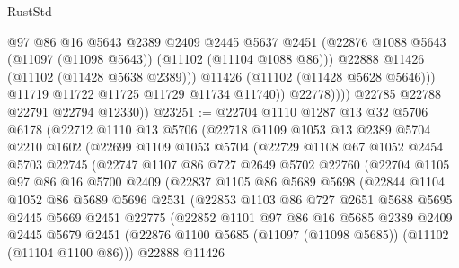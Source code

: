 \begin{lexlean}{RustStd}
\begin{coremodule}
                        @97
                        @86
                        @16
                        @5643
                        @2389
                        @2409
                        @2445
                        @5637
                        @2451
                        (@22876 @1088 @5643 (@11097 (@11098 @5643)) (@11102 (@11104 @1088 @86)))
                        @22888
                        @11426
                        (@11102 (@11428 @5638 @2389)))
                      @11426
                      (@11102 (@11428 @5628 @5646)))
                    @11719
                    @11722
                    @11725
                    @11729
                    @11734
                    @11740))
                @22778))))
        @22785
        @22788
        @22791
        @22794
        @12330))
@23251 := @22704
    @1110
    @1287
    @13
    @32
    @5706
    @6178
    (@22712
      @1110
      @13
      @5706
      (@22718
        @1109
        @1053
        @13
        @2389
        @5704
        @2210
        @1602
        (@22699
          @1109
          @1053
          @5704
          (@22729
            @1108
            @67
            @1052
            @2454
            @5703
            @22745
            (@22747
              @1107
              @86
              @727
              @2649
              @5702
              @22760
              (@22704
                @1105
                @97
                @86
                @16
                @5700
                @2409
                (@22837
                  @1105
                  @86
                  @5689
                  @5698
                  (@22844
                    @1104
                    @1052
                    @86
                    @5689
                    @5696
                    @2531
                    (@22853
                      @1103
                      @86
                      @727
                      @2651
                      @5688
                      @5695
                      @2445
                      @5669
                      @2451
                      @22775
                      (@22852
                        @1101
                        @97
                        @86
                        @16
                        @5685
                        @2389
                        @2409
                        @2445
                        @5679
                        @2451
                        (@22876 @1100 @5685 (@11097 (@11098 @5685)) (@11102 (@11104 @1100 @86)))
                        @22888
                        @11426

\end{coremodule}
\end{lexlean}
